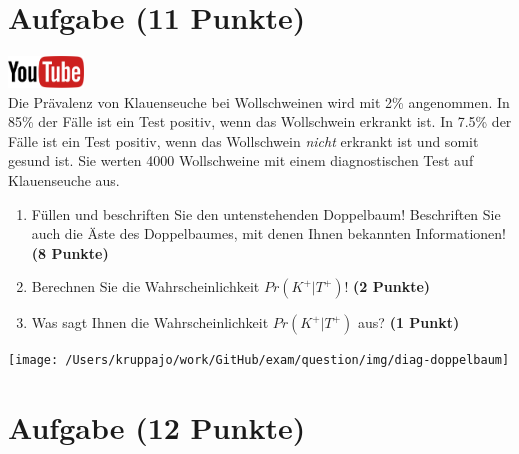 \documentclass[a4paper, 9pt]{scrartcl}\usepackage[]{graphicx}\usepackage[]{xcolor}
\begin{document}
\clearpage

\section{Aufgabe \hfill (11 Punkte)}

\hfill\href{https://youtu.be/VQlNl8hvRII}{\includegraphics[width =
  2cm]{img/youtube}}\\[1Ex]


Die Pr{\"a}valenz von Klauenseuche bei Wollschweinen wird mit
2\% angenommen. In 85\% der F{\"a}lle ist ein Test positiv, wenn das Wollschwein erkrankt
ist. In 7.5\% der F{\"a}lle ist ein Test positiv,
wenn das Wollschwein \textit{nicht} erkrankt ist und somit gesund ist. Sie
werten 4000 Wollschweine mit einem
diagnostischen Test auf Klauenseuche aus.



\begin{enumerate}
\item F{\"u}llen und beschriften Sie den untenstehenden Doppelbaum! Beschriften
  Sie auch die {\"A}ste des Doppelbaumes, mit denen Ihnen bekannten
  Informationen!  \textbf{(8 Punkte)}
\item Berechnen Sie die Wahrscheinlichkeit $Pr(K^+|T^+)$! \textbf{(2 Punkte)}
\item Was sagt Ihnen die Wahrscheinlichkeit $Pr(K^+|T^+)$ aus? \textbf{(1 Punkt)}
\end{enumerate}

\vspace{1cm}

\begin{center}
  \texttt{[image: /Users/kruppajo/work/GitHub/exam/question/img/diag-doppelbaum]}
\end{center}



 
\clearpage

\section{Aufgabe \hfill (12 Punkte)}
\end{document}
